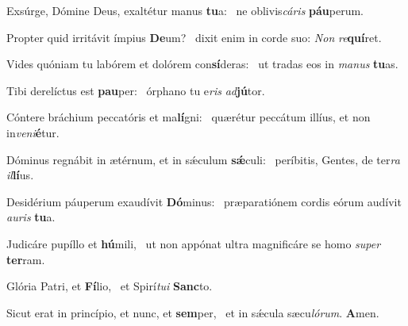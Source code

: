 \item Exsúrge, Dómine Deus, exaltétur manus \textbf{tu}a:~\psstar{} ne oblivis\textit{cáris} \textbf{páu}perum.
\item Propter quid irritávit ímpius \textbf{De}um?~\psstar{} dixit enim in corde suo: \textit{Non} \textit{re}\textbf{quí}ret.
\item Vides quóniam tu labórem et dolórem con\textbf{sí}deras:~\psstar{} ut tradas eos in \textit{manus} \textbf{tu}as.
\item Tibi derelíctus est \textbf{pau}per:~\psstar{} órphano tu e\textit{ris} \textit{ad}\textbf{jú}tor.
\item Cóntere bráchium peccatóris et ma\textbf{lí}gni:~\psstar{} quærétur peccátum illíus, et non in\textit{veni}\textbf{é}tur.
\item Dóminus regnábit in ætérnum, et in sǽculum \textbf{sǽ}culi:~\psstar{} períbitis, Gentes, de ter\textit{ra} \textit{il}\textbf{lí}us.
\item Desidérium páuperum exaudívit \textbf{Dó}minus:~\psstar{} præparatiónem cordis eórum audívit \textit{auris} \textbf{tu}a.
\item Judicáre pupíllo et \textbf{hú}mili,~\psstar{} ut non appónat ultra magnificáre se homo \textit{super} \textbf{ter}ram.
\item Glória Patri, et \textbf{Fí}lio,~\psstar{} et Spirí\textit{tui} \textbf{Sanc}to.
\item Sicut erat in princípio, et nunc, et \textbf{sem}per,~\psstar{} et in sǽcula sæcu\textit{lórum}. \textbf{A}men.
